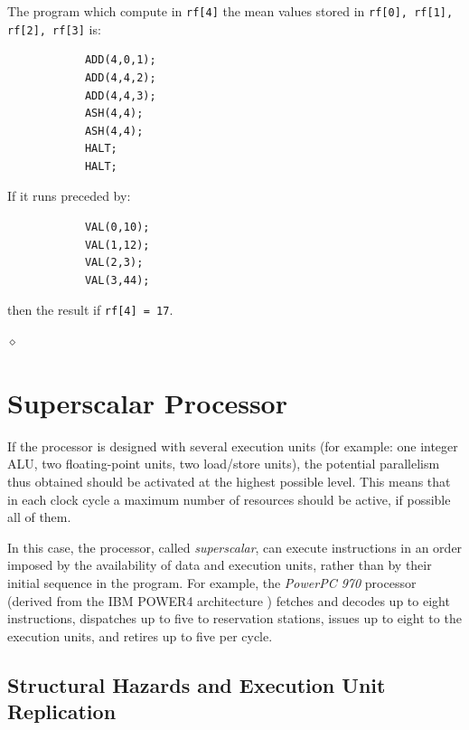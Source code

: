 \begin{exemplu}
The program which compute in {\tt rf[4]} the mean values stored in {\tt rf[0], rf[1], rf[2], rf[3]} is:
\begin{verbatim}
            ADD(4,0,1);
            ADD(4,4,2);
            ADD(4,4,3);
            ASH(4,4);
            ASH(4,4);
            HALT;
            HALT;
\end{verbatim}
If it runs  preceded by:
\begin{verbatim}
            VAL(0,10);
            VAL(1,12);
            VAL(2,3);
            VAL(3,44);
\end{verbatim}
then the result if {\tt rf[4] = 17}.

$\diamond$
\end{exemplu}

\section{Superscalar Processor}

If the processor is designed with several execution units (for example: one integer ALU, two floating-point units, two load/store units), the potential parallelism thus obtained should be activated at the highest possible level. This means that in each clock cycle a maximum number of resources should be active, if possible all of them.

In this case, the processor, called  {\em superscalar}, can execute instructions in an order imposed by the availability of data and execution units, rather than by their initial sequence in the  program. For example, the {\em PowerPC 970} processor (derived from the IBM POWER4 architecture \cite{tendler2002power4}) fetches and decodes up to eight instructions, dispatches up to five to reservation stations, issues up to eight to the execution units, and retires up to five per cycle.

\subsection{Structural Hazards and Execution Unit Replication}\label{sec:superscalar_structural_hazards}

